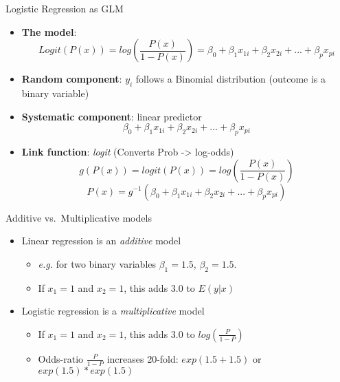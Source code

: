 \documentclass[
  ignorenonframetext,
]{beamer}
\providecommand{\tightlist}{%
  \setlength{\itemsep}{0pt}\setlength{\parskip}{0pt}}
\begin{document}
\begin{frame}{Logistic Regression as GLM}
\protect\hypertarget{logistic-regression-as-glm}{}

\begin{itemize}
\item
  \textbf{The model}: \[
  Logit(P(x)) = log \left( \frac{P(x)}{1-P(x)} \right) = \beta_0 + \beta_1 x_{1i} + \beta_2 x_{2i} + ... + \beta_p x_{pi}
  \]
\item
  \textbf{Random component}: \(y_i\) follows a Binomial distribution
  (outcome is a binary variable)
\item
  \textbf{Systematic component}: linear predictor \[
  \beta_0 + \beta_1 x_{1i} + \beta_2 x_{2i} + ... + \beta_p x_{pi}
  \]
\item
  \textbf{Link function}: \emph{logit} (Converts Prob -\textgreater{}
  log-odds) \[
  g(P(x)) = logit(P(x)) = log\left( \frac{P(x)}{1-P(x)} \right)
  \] \[
  P(x) = g^{-1}\left( \beta_0 + \beta_1 x_{1i} + \beta_2 x_{2i} + ... + \beta_p x_{pi}
   \right)
  \]
\end{itemize}

\end{frame}

\begin{frame}{Additive vs.~Multiplicative models}
\protect\hypertarget{additive-vs.-multiplicative-models}{}

\begin{itemize}
\tightlist
\item
  Linear regression is an \emph{additive} model

  \begin{itemize}
  \tightlist
  \item
    \emph{e.g.} for two binary variables \(\beta_1 = 1.5\),
    \(\beta_2 = 1.5\).
  \item
    If \(x_1=1\) and \(x_2=1\), this adds 3.0 to \(E(y|x)\)
  \end{itemize}
\item
  Logistic regression is a \emph{multiplicative} model

  \begin{itemize}
  \tightlist
  \item
    If \(x_1=1\) and \(x_2=1\), this adds 3.0 to \(log(\frac{P}{1-P})\)
  \item
    Odds-ratio \(\frac{P}{1-P}\) increases 20-fold: \(exp(1.5+1.5)\) or
    \(exp(1.5) * exp(1.5)\)
  \end{itemize}
\end{itemize}

\end{frame}
\end{document}
